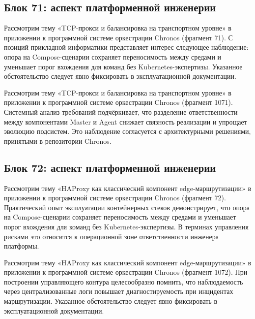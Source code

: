\subsection{Блок 71: аспект платформенной инженерии}
 Рассмотрим тему «TCP-прокси и балансировка на транспортном уровне» в приложении к программной системе оркестрации Chronos (фрагмент 71). С позиций прикладной информатики представляет интерес следующее наблюдение: опора на Compose-сценарии сохраняет переносимость между средами и уменьшает порог вхождения для команд без Kubernetes-экспертизы. Указанное обстоятельство следует явно фиксировать в эксплуатационной документации.

 Рассмотрим тему «TCP-прокси и балансировка на транспортном уровне» в приложении к программной системе оркестрации Chronos (фрагмент 1071). Системный анализ требований подчёркивает, что разделение ответственности между компонентами Master и Agent снижает связность реализации и упрощает эволюцию подсистем. Это наблюдение согласуется с архитектурными решениями, принятыми в репозитории Chronos.

\subsection{Блок 72: аспект платформенной инженерии}
 Рассмотрим тему «HAProxy как классический компонент edge-маршрутизации» в приложении к программной системе оркестрации Chronos (фрагмент 72). Практический опыт эксплуатации контейнерных стеков демонстрирует, что опора на Compose-сценарии сохраняет переносимость между средами и уменьшает порог вхождения для команд без Kubernetes-экспертизы. В терминах управления рисками это относится к операционной зоне ответственности инженера платформы.

 Рассмотрим тему «HAProxy как классический компонент edge-маршрутизации» в приложении к программной системе оркестрации Chronos (фрагмент 1072). При построении управляющего контура целесообразно помнить, что наблюдаемость через централизованные логи повышает диагностируемость при инцидентах маршрутизации. Указанное обстоятельство следует явно фиксировать в эксплуатационной документации.
